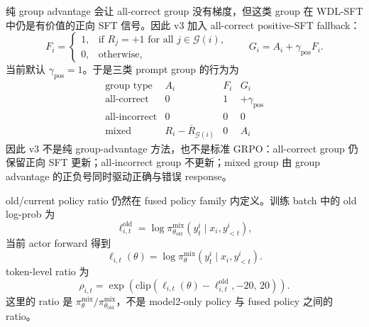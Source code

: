 纯 group advantage 会让 all-correct group 没有梯度，但这类 group 在 WDL-SFT 中仍是有价值的正向 SFT 信号。因此 v3 加入 all-correct positive-SFT fallback：
\begin{equation}
    F_i =
    \begin{cases}
        1,
        & \text{if } R_j=+1 \text{ for all } j\in\mathcal{G}(i),\\
        0,
        & \text{otherwise},
    \end{cases}
    \qquad
    G_i = A_i + \gamma_{\mathrm{pos}}F_i.
    \label{eq:v3_effective_coeff}
\end{equation}
当前默认 $\gamma_{\mathrm{pos}}=1$。于是三类 prompt group 的行为为
\begin{equation}
    \begin{array}{c|c|c|c}
    \text{group type} & A_i & F_i & G_i \\
    \hline
    \text{all-correct} & 0 & 1 & +\gamma_{\mathrm{pos}} \\
    \text{all-incorrect} & 0 & 0 & 0 \\
    \text{mixed} & R_i-\overline{R}_{\mathcal{G}(i)} & 0 & A_i
    \end{array}
    \label{eq:v3_group_cases}
\end{equation}
因此 v3 不是纯 group-advantage 方法，也不是标准 GRPO：all-correct group 仍保留正向 SFT 更新；all-incorrect group 不更新；mixed group 由 group advantage 的正负号同时驱动正确与错误 response。

old/current policy ratio 仍然在 fused policy family 内定义。训练 batch 中的 old log-prob 为
\begin{equation}
    \ell^{\mathrm{old}}_{i,t}
    =
    \log \pi^{\mathrm{mix}}_{\theta_{\mathrm{old}}}
    \left(y^i_t\mid x_i,y^i_{<t}\right),
\end{equation}
当前 actor forward 得到
\begin{equation}
    \ell_{i,t}(\theta)
    =
    \log \pi^{\mathrm{mix}}_\theta
    \left(y^i_t\mid x_i,y^i_{<t}\right).
\end{equation}
token-level ratio 为
\begin{equation}
    \rho_{i,t}
    =
    \exp\!\left(
        \mathrm{clip}\left(
            \ell_{i,t}(\theta)-\ell^{\mathrm{old}}_{i,t},
            -20,\,
            20
        \right)
    \right).
    \label{eq:v3_ratio}
\end{equation}
这里的 ratio 是 $\pi^{\mathrm{mix}}_\theta/\pi^{\mathrm{mix}}_{\theta_{\mathrm{old}}}$，不是 model2-only policy 与 fused policy 之间的 ratio。

